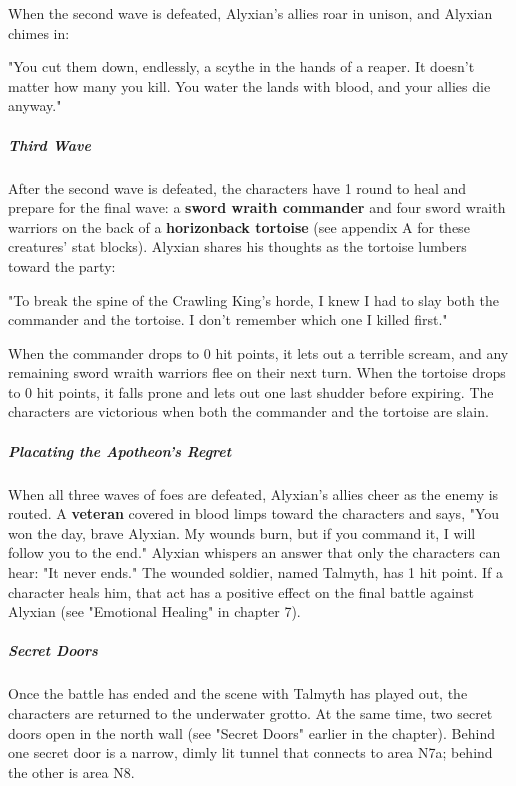 \documentclass[10pt,a4paper,twoside,fancy,bg=print,twocolumn,openany,nodeprecatedcode]{dndbook}
\begin{document}
When the second wave is defeated, Alyxian's allies roar in unison, and Alyxian chimes in:

\begin{DndReadAloud}{}
"You cut them down, endlessly, a scythe in the hands of a reaper. It doesn't matter how many you kill. You water the lands with blood, and your allies die anyway."

\end{DndReadAloud}

\subparagraph{Third Wave}
After the second wave is defeated, the characters have 1 round to heal and prepare for the final wave: a \textbf{sword wraith commander} and four sword wraith warriors on the back of a \textbf{horizonback tortoise} (see appendix A for these creatures' stat blocks). Alyxian shares his thoughts as the tortoise lumbers toward the party:

\begin{DndReadAloud}{}
"To break the spine of the Crawling King's horde, I knew I had to slay both the commander and the tortoise. I don't remember which one I killed first."

\end{DndReadAloud}

When the commander drops to 0 hit points, it lets out a terrible scream, and any remaining sword wraith warriors flee on their next turn. When the tortoise drops to 0 hit points, it falls prone and lets out one last shudder before expiring. The characters are victorious when both the commander and the tortoise are slain.

\subparagraph{Placating the Apotheon's Regret}
When all three waves of foes are defeated, Alyxian's allies cheer as the enemy is routed. A \textbf{veteran} covered in blood limps toward the characters and says, "You won the day, brave Alyxian. My wounds burn, but if you command it, I will follow you to the end." Alyxian whispers an answer that only the characters can hear: "It never ends." The wounded soldier, named Talmyth, has 1 hit point. If a character heals him, that act has a positive effect on the final battle against Alyxian (see "Emotional Healing" in chapter 7).

\subparagraph{Secret Doors}
Once the battle has ended and the scene with Talmyth has played out, the characters are returned to the underwater grotto. At the same time, two secret doors open in the north wall (see "Secret Doors" earlier in the chapter). Behind one secret door is a narrow, dimly lit tunnel that connects to area N7a; behind the other is area N8.
\end{document}

